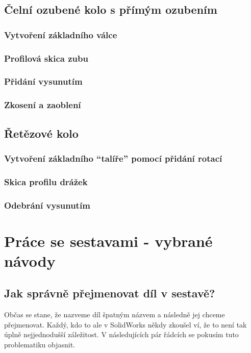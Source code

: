 \section{Čelní ozubené kolo s přímým ozubením}

\subsection*{Vytvoření základního válce}

\subsection*{Profilová skica zubu}

\subsection*{Přidání vysunutím}

\subsection*{Zkosení a zaoblení}

\section{Řetězové kolo}

\subsection*{Vytvoření základního \enquote{talíře} pomocí přidání rotací}

\subsection*{Skica profilu drážek}

\subsection*{Odebrání vysunutím}

\newpage

\chapter{Práce se sestavami - vybrané návody}

\section{Jak správně přejmenovat díl v sestavě?}
Občas se stane, že nazveme díl špatným názvem a následně jej chceme přejmenovat.
Každý, kdo to ale v SolidWorks někdy zkoušel ví, že to není tak úplně nejjednodušší záležitost.
V následujících pár řádcích se pokusím tuto problematiku objasnit.

